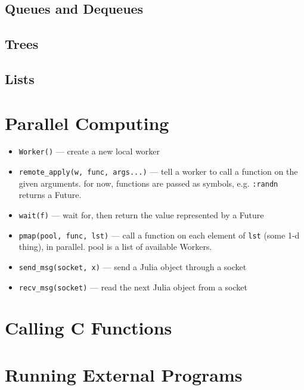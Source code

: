 \documentclass{article}
\begin{document}
\subsection{Queues and Dequeues}
\subsection{Trees}
\subsection{Lists}

\section{Parallel Computing}
\begin{itemize}
  \item \verb|Worker()| ---
     create a new local worker

  \item \verb|remote_apply(w, func, args...)| ---
     tell a worker to call a function on the given arguments.
     for now, functions are passed as symbols, e.g. \verb|:randn|
     returns a Future.

   \item \verb|wait(f)| ---
     wait for, then return the value represented by a Future

   \item \verb|pmap(pool, func, lst)| ---
     call a function on each element of \verb|lst| (some 1-d thing), in
     parallel. pool is a list of available Workers.

   \item \verb|send_msg(socket, x)| ---
     send a Julia object through a socket

   \item \verb|recv_msg(socket)| ---
     read the next Julia object from a socket
\end{itemize}

\section{Calling C Functions}
\section{Running External Programs}
\end{document}

